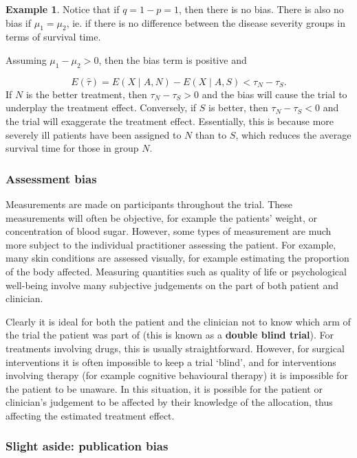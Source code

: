 \documentclass[
  openany]{book}
\theoremstyle{definition}
\theoremstyle{definition}
\newtheorem{example}{Example}[chapter]
\theoremstyle{definition}
\theoremstyle{definition}
\theoremstyle{remark}
\begin{document}
\begin{example}
Notice that if \(q=1-p = 1\), then there is no bias. There is also no bias if \(\mu_1 = \mu_2\), ie. if there is no difference between the disease severity groups in terms of survival time.

Assuming \(\mu_1 - \mu_2 >0\), then the bias term is positive and

\[E\left(\hat\tau\right) = E\left(X\mid{A,N}\right)- E\left(X\mid{A,S}\right) < \tau_N - \tau_S.\]
If \(N\) is the better treatment, then \(\tau_N - \tau_S>0\) and the bias will cause the trial to underplay the treatment effect. Conversely, if \(S\) is better, then \(\tau_N-\tau_S<0\) and the trial will exaggerate the treatment effect. Essentially, this is because more severely ill patients have been assigned to \(N\) than to \(S\), which reduces the average survival time for those in group \(N\).
\end{example}

\subsubsection*{Assessment bias}\label{assessment-bias}

Measurements are made on participants throughout the trial. These measurements will often be objective, for example the patients' weight, or concentration of blood sugar. However, some types of measurement are much more subject to the individual practitioner assessing the patient. For example, many skin conditions are assessed visually, for example estimating the proportion of the body affected. Measuring quantities such as quality of life or psychological well-being involve many subjective judgements on the part of both patient and clinician.

Clearly it is ideal for both the patient and the clinician not to know which arm of the trial the patient was part of (this is known as a \textbf{double blind trial}). For treatments involving drugs, this is usually straightforward. However, for surgical interventions it is often impossible to keep a trial `blind', and for interventions involving therapy (for example cognitive behavioural therapy) it is impossible for the patient to be unaware. In this situation, it is possible for the patient or clinician's judgement to be affected by their knowledge of the allocation, thus affecting the estimated treatment effect.

\subsubsection*{Slight aside: publication bias}\label{slight-aside-publication-bias}
\end{document}
